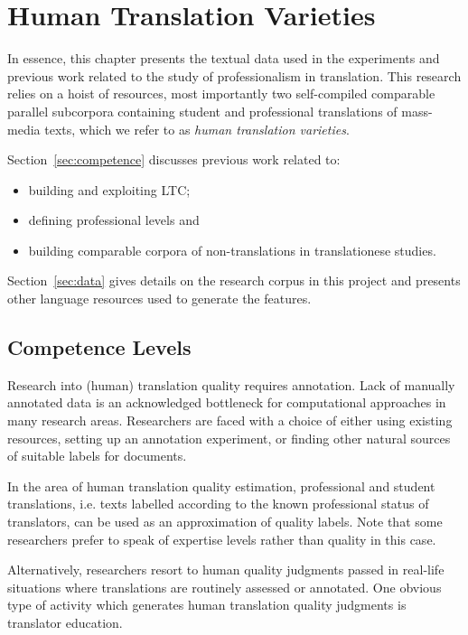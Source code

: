 \chapter{\label{cha:varieties}Human Translation Varieties}
In essence, this chapter presents the textual data used in the experiments and previous work related to the study of professionalism in translation.  
This research relies on a hoist of resources, most importantly two self-compiled comparable parallel subcorpora containing student and professional translations of mass-media texts, which we refer to as \textit{human translation varieties}. 

Section~\ref{sec:competence} discusses previous work related to:
\begin{itemize}\compresslist{}
	\item building and exploiting \gls{LTC};
	\item defining professional levels and
	\item building comparable corpora of non-translations in translationese studies.
\end{itemize}

Section~\ref{sec:data} gives details on the research corpus in this project and presents other language resources used to generate the features.

\section{\label{sec:competence}Competence Levels}

Research into (human) translation quality requires annotation. Lack of manually annotated data is an acknowledged bottleneck for computational approaches in many research areas. Researchers are faced with a choice of either using existing resources, setting up an annotation experiment, or finding other natural sources of suitable labels for documents. 

In the area of human translation quality estimation, professional and student translations, i.e. texts labelled according to the known professional status of translators, can be used as an approximation of quality labels. Note that some researchers prefer to speak of expertise levels rather than quality in this case. 

Alternatively, researchers resort to human quality judgments passed in real-life situations where translations are routinely assessed or annotated. One obvious type of activity which generates human translation quality judgments is translator education. 

